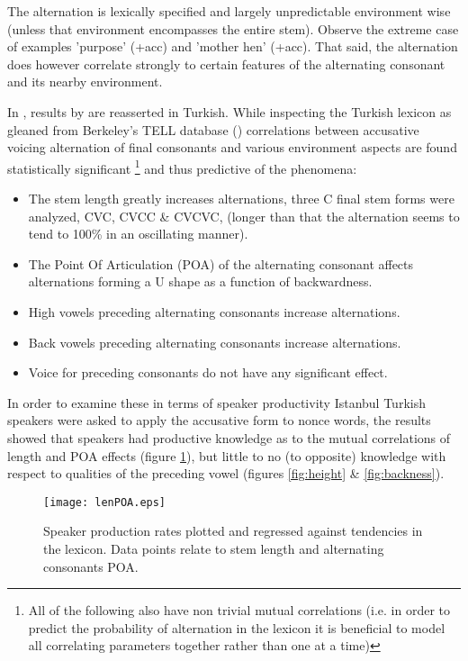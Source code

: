 \documentclass[a4paper,12pt]{article}
\begin{document}
The alternation is lexically specified and largely unpredictable environment wise (unless that
environment encompasses the entire stem). Observe the extreme case of examples \textipa{[ama\t{tS}]}
'purpose' \textipa{[ama\t{tS}W]} (+acc) and \textipa{[ana\t{tS}]} 'mother hen'
\textipa{[ana\t{dZ}W]} (+acc). That said, the alternation does however correlate strongly to
certain features of the alternating consonant and its nearby environment.

In \cite{becker_phonological_2009}, results by \cite{moreton_analytic_2008} are reasserted in
Turkish. While inspecting the Turkish lexicon as gleaned from Berkeley's TELL database
(\cite{inkelas_turkish_2000}) correlations between accusative voicing alternation of final
consonants and various environment aspects are found statistically significant \footnote{All of the
following also have non trivial mutual correlations (i.e. in order to predict the probability of
alternation in the lexicon it is beneficial to model all correlating parameters together rather
than one at a time)} and thus predictive of the phenomena:
\begin{itemize}
  \item The stem length greatly increases alternations, three C final stem forms were analyzed,
  CVC, CVCC \& CVCVC, (longer than that the alternation seems to tend to 100\% in an oscillating
  manner).
  \item The Point Of Articulation (POA) of the alternating consonant affects alternations forming a
  U shape as a function of backwardness.
  \item High vowels preceding alternating consonants increase alternations.
  \item Back vowels preceding alternating consonants increase alternations.
  \item Voice for preceding consonants do not have any significant effect.
\end{itemize}
In order to examine these in terms of speaker productivity Istanbul Turkish speakers were asked to
apply the accusative form to nonce words, the results showed that speakers had productive knowledge
as to the mutual correlations of length and POA effects (figure \ref{fig:lenPOA}), but little to no
(to opposite) knowledge with respect to qualities of the preceding vowel (figures \ref{fig:height}
\& \ref{fig:backness}).
\begin{figure}[!ht]
\centering
\texttt{[image: lenPOA.eps]}
\caption{Speaker production rates plotted and regressed against tendencies in the lexicon. Data
points relate to stem length and alternating consonants POA.}
\label{fig:lenPOA}
\end{figure}
\end{document}
